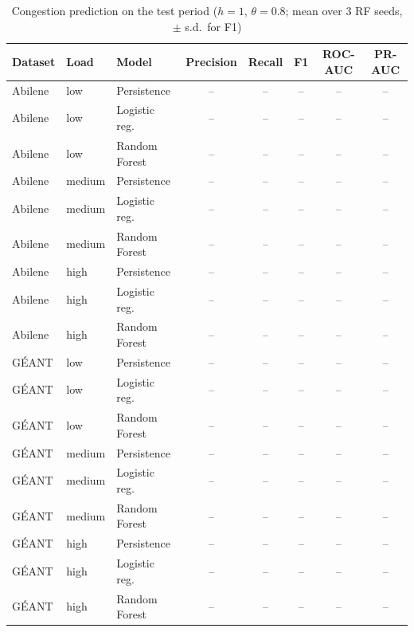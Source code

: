 \begin{table}[t]
\centering
\caption{Congestion prediction on the test period ($h=1$, $\theta=0.8$; mean over 3 RF seeds, $\pm$ s.d.\ for F1)}
\label{tab:pred}
\scriptsize
\begin{tabular}{@{}lllccccc@{}}
\toprule
Dataset & Load & Model & Precision & Recall & F1 & ROC-AUC & PR-AUC \\
\midrule
Abilene & low & Persistence & -- & -- & -- & -- & -- \\
Abilene & low & Logistic reg. & -- & -- & -- & -- & -- \\
Abilene & low & Random Forest & -- & -- & -- & -- & -- \\
Abilene & medium & Persistence & -- & -- & -- & -- & -- \\
Abilene & medium & Logistic reg. & -- & -- & -- & -- & -- \\
Abilene & medium & Random Forest & -- & -- & -- & -- & -- \\
Abilene & high & Persistence & -- & -- & -- & -- & -- \\
Abilene & high & Logistic reg. & -- & -- & -- & -- & -- \\
Abilene & high & Random Forest & -- & -- & -- & -- & -- \\
G\'EANT & low & Persistence & -- & -- & -- & -- & -- \\
G\'EANT & low & Logistic reg. & -- & -- & -- & -- & -- \\
G\'EANT & low & Random Forest & -- & -- & -- & -- & -- \\
G\'EANT & medium & Persistence & -- & -- & -- & -- & -- \\
G\'EANT & medium & Logistic reg. & -- & -- & -- & -- & -- \\
G\'EANT & medium & Random Forest & -- & -- & -- & -- & -- \\
G\'EANT & high & Persistence & -- & -- & -- & -- & -- \\
G\'EANT & high & Logistic reg. & -- & -- & -- & -- & -- \\
G\'EANT & high & Random Forest & -- & -- & -- & -- & -- \\
\bottomrule
\end{tabular}
\end{table}
